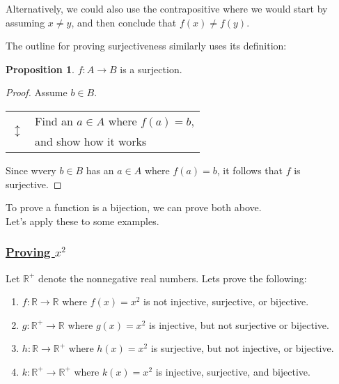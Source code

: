 \documentclass{amsart}
\theoremstyle{definition}
\theoremstyle{definition}
\newtheorem*{prpn}{Proposition}
\theoremstyle{remark}
\begin{document}
Alternatively, we could also use the contrapositive where we would start by assuming $x\neq y$, and then conclude that $f(x) \neq f(y)$.


The outline for proving surjectiveness similarly uses its definition:

\begin{prpn}
      $f:A\rightarrow B$ is a surjection.
\end{prpn}

\begin{proof}
      Assume $b \in B$.

            \begin{center}
            \begin{tabular}{r l}
                  \multirow{2}{*}{\huge $\updownarrow$} & Find an $a \in A$ where $f(a)=b$, \\
                  & and show how it works \\
            \end{tabular}
            \end{center}

            Since wvery $b\in B$ has an $a \in A$ where $f(a) = b$, it follows that $f$ is surjective.

\end{proof}

To prove a function is a bijection, we can prove both above. \\
Let's apply these to some examples.








\bigskip \bigskip

\subsubsection{\underline{Proving $x^2$}}\hspace*{\fill}


Let $\mathbb{R^+}$ denote the nonnegative real numbers. Lets prove the following:
\begin{enumerate}[label=(\alph*)]
      \item $f : \mathbb{R} \rightarrow \mathbb{R}$ where $f(x)=x^2$ is not injective, surjective, or bijective.
      \item $g : \mathbb{R^+} \rightarrow \mathbb{R}$ where $g(x)=x^2$ is injective, but not surjective or bijective.
      \item $h : \mathbb{R} \rightarrow \mathbb{R^+}$ where $h(x)=x^2$ is surjective, but not injective, or bijective.
      \item $k : \mathbb{R^+} \rightarrow \mathbb{R^+}$ where $k(x)=x^2$ is injective, surjective, and bijective.
\end{enumerate}
\end{document}
